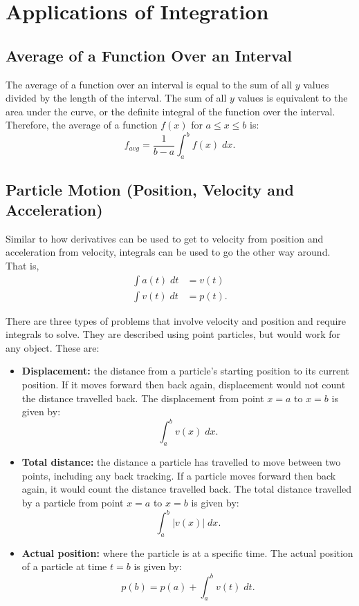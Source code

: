 \section{Applications of Integration}

\subsection{Average of a Function Over an Interval}
The average of a function over an interval is equal to the sum of all $y$ values divided by the length of the interval. The sum of all $y$ values is equivalent to the area under the curve, or the definite integral of the function over the interval. Therefore, the average of a function $f(x)$ for $a \leq x \leq b$ is:
\[ f_{avg} = \frac{1}{b - a} \int_a^b f(x) \; dx. \]

\subsection{Particle Motion (Position, Velocity and Acceleration)}
Similar to how derivatives can be used to get to velocity from position and acceleration from velocity, integrals can be used to go the other way around. That is,
\begin{align*}
    \int a(t) \; dt &= v(t) \\[5pt]
    \int v(t) \; dt &= p(t).
\end{align*}

There are three types of problems that involve velocity and position and require integrals to solve. They are described using point particles, but would work for any object. These are:
\begin{itemize}
    \item \textbf{Displacement:} the distance from a particle's starting position to its current position. If it moves forward then back again, displacement would not count the distance travelled back. The displacement from point $x = a$ to $x = b$ is given by:
    \[ \int_a^b v(x) \; dx. \]

    \item \textbf{Total distance:} the distance a particle has travelled to move between two points, including any back tracking. If a particle moves forward then back again, it would count the distance travelled back. The total distance travelled by a particle from point $x = a$ to $x = b$ is given by:
    \[ \int_a^b |v(x)| \; dx. \]

    \item \textbf{Actual position:} where the particle is at a specific time. The actual position of a particle at time $t = b$ is given by:
    \[ p(b) = p(a) + \int_a^b v(t) \; dt. \]
\end{itemize}


